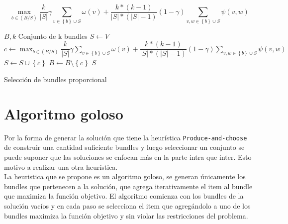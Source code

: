 \begin{equation}
\max_{b \in (B/S)}{\dfrac{k}{|S|}} \gamma \sum_{v \in \left\{b\right\} \cup S}{\omega(v)} + \dfrac{k * (k-1)}{|S| * (|S|-1)} (1-\gamma) \sum_{v,w \in \left\{b\right\} \cup S}{\psi(v,w)}
\end{equation}

\begin{algorithm}[H]
\begin{algorithmic}[1]
\REQUIRE $B,k$
\ENSURE Conjunto de k bundles
\STATE $S \leftarrow V$
\STATE $c \leftarrow \max_{b \in (B/S)}{\dfrac{k}{|S|}} \gamma \sum_{v \in \left\{b\right\} \cup S}{\omega(v)} + \dfrac{k * (k-1)}{|S| * (|S|-1)} (1-\gamma) \sum_{v,w \in \left\{b\right\} \cup S}{\psi(v,w)}$
\STATE $S \leftarrow S \cup \left\{c\right\}$
\STATE $B \leftarrow B \setminus \left\{c\right\}$
\ENDWHILE
\RETURN $S$
\end{algorithmic}
\caption{Selección de bundles proporcional}\label{alg:algSelProp}
\end{algorithm}

\section{Algoritmo goloso}
Por la forma de generar la solución que tiene la heurística \texttt{Produce-and-choose} de construir una cantidad suficiente bundles y luego seleccionar un conjunto se puede suponer que las soluciones se enfocan más en la parte intra que inter. Esto motivo a realizar una otra heurística.\\
La heuristica que se propone es un algoritmo goloso, se generan únicamente los bundles que pertenecen a la solución, que agrega iterativamente el item al bundle que maximiza la función objetivo. El algoritmo comienza con los bundles de la solución vacíos y en cada paso se selecciona el item que agregándolo a uno de los bundles maximiza la función objetivo y sin violar las restricciones del problema.

